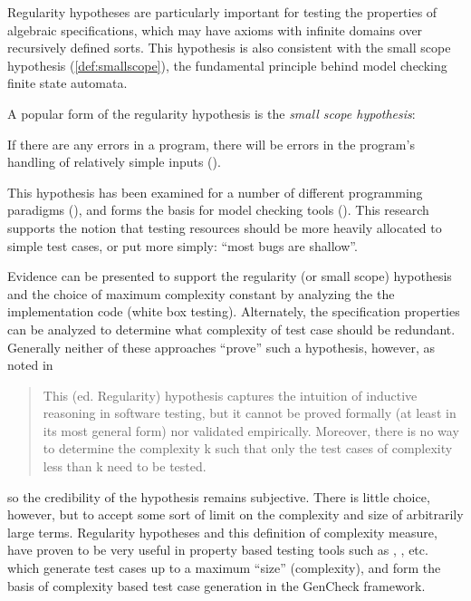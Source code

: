\noindent 
Regularity hypotheses are particularly important for 
testing the properties of algebraic specifications,
which may have axioms with infinite domains over recursively defined sorts.
This hypothesis is also consistent with the small scope hypothesis (\ref{def:smallscope}), 
the fundamental principle behind model checking finite state automata.

A popular form of the regularity hypothesis is the \emph{small scope hypothesis}:
\begin{df}\label{def:smallscope}
If there are any errors in a program,
there will be errors in the program's handling of relatively simple inputs
(\cite{JacksonDamon1996}).
\end{df}
\noindent
This hypothesis has been examined for 
a number of different programming paradigms (\cite{Andoni2003}),
and forms the basis for model checking tools (\cite{ClarkePeled1999}).
This research supports the notion that
testing resources should be more heavily allocated to simple test cases,
or put more simply: ``most bugs are shallow''.

Evidence can be presented to support the regularity (or small scope) hypothesis
and the choice of maximum complexity constant
by analyzing the the implementation code (white box testing).
Alternately, the specification properties can be analyzed 
to determine what complexity of test case should be redundant.
Generally neither of these approaches  ``prove'' such a hypothesis, however,
as noted in \cite{ZhuHallMay1997} 

\begin{quote}
This (ed. Regularity) hypothesis captures the intuition of 
inductive reasoning in software testing, but it cannot be proved formally 
(at least in its most general form) nor validated empirically. 
Moreover, there is no way to determine the complexity k such
that only the test cases of complexity less than k need to be tested.
\end{quote}

\noindent so the credibility of the hypothesis remains subjective.
There is little choice, however, but to accept some sort of limit
on the complexity and size of arbitrarily large terms.
Regularity hypotheses and this definition of complexity measure, 
have proven to be very useful in property based testing tools 
such as \QC, \SC, etc. which generate test cases up to a maximum ``size'' (complexity),
and form the basis of complexity based test case generation in the GenCheck framework.

